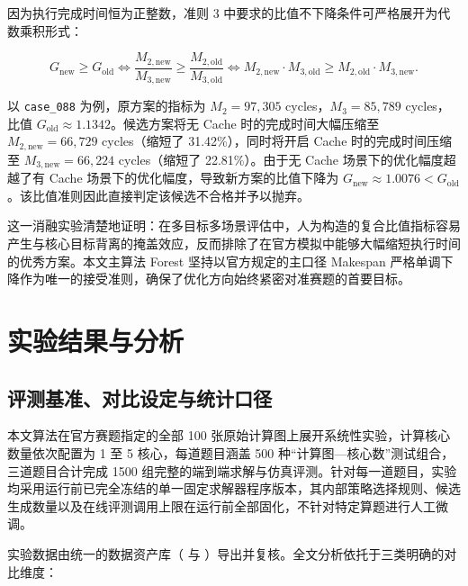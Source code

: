 \documentclass[anonymous,withtoc]{gmcm2026}
\begin{document}
因为执行完成时间恒为正整数，准则 3 中要求的比值不下降条件可严格展开为代数乘积形式：

\begin{equation}
G_{\mathrm{new}} \ge G_{\mathrm{old}} \iff \frac{M_{2, \mathrm{new}}}{M_{3, \mathrm{new}}} \ge \frac{M_{2, \mathrm{old}}}{M_{3, \mathrm{old}}} \iff M_{2, \mathrm{new}} \cdot M_{3, \mathrm{old}} \ge M_{2, \mathrm{old}} \cdot M_{3, \mathrm{new}}.
\end{equation}

以 \texttt{case\_088} 为例，原方案的指标为 \(M_2 = 97{,}305\) cycles，\(M_3 = 85{,}789\) cycles，比值 \(G_{\mathrm{old}} \approx 1.1342\)。候选方案将无 Cache 时的完成时间大幅压缩至 \(M_{2, \mathrm{new}} = 66{,}729\) cycles（缩短了 31.42\%），同时将开启 Cache 时的完成时间压缩至 \(M_{3, \mathrm{new}} = 66{,}224\) cycles（缩短了 22.81\%）。由于无 Cache 场景下的优化幅度超越了有 Cache 场景下的优化幅度，导致新方案的比值下降为 \(G_{\mathrm{new}} \approx 1.0076 < G_{\mathrm{old}}\)。该比值准则因此直接判定该候选不合格并予以抛弃。

这一消融实验清楚地证明：在多目标多场景评估中，人为构造的复合比值指标容易产生与核心目标背离的掩盖效应，反而排除了在官方模拟中能够大幅缩短执行时间的优秀方案。本文主算法 Forest 坚持以官方规定的主口径 Makespan 严格单调下降作为唯一的接受准则，确保了优化方向始终紧密对准赛题的首要目标。


\section{实验结果与分析}

\subsection{评测基准、对比设定与统计口径}

本文算法在官方赛题指定的全部 100 张原始计算图上展开系统性实验，计算核心数量依次配置为 1 至 5 核心，每道题目涵盖 500 种``计算图---核心数''测试组合，三道题目合计完成 1500 组完整的端到端求解与仿真评测。针对每一道题目，实验均采用运行前已完全冻结的单一固定求解器程序版本，其内部策略选择规则、候选生成数量以及在线评测调用上限在运行前全部固化，不针对特定算题进行人工微调。

实验数据由统一的数据资产库（\texttt{} 与 \texttt{}）导出并复核。全文分析依托于三类明确的对比维度：
\end{document}
